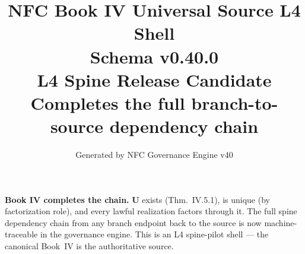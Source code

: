 \documentclass[11pt]{article}
\title{NFC Book IV Universal Source L4 Shell\\[1ex]\large Schema v0.40.0\\[0.5ex]
\normalsize L4 Spine Release Candidate\\[0.5ex]
\small Completes the full branch-to-source dependency chain}
\author{Generated by NFC Governance Engine v40}
\date{}
\begin{document}
\maketitle
\tableofcontents
\bigskip
\noindent\textbf{Book IV completes the chain.} $\mathbf{U}$ exists (Thm.~IV.5.1),
is unique (by factorization role), and every lawful realization factors through it.
The full spine dependency chain from any branch endpoint back to the source
is now machine-traceable in the governance engine.
This is an L4 spine-pilot shell --- the canonical Book~IV is the authoritative source.
\vspace{1em}

\end{document}
